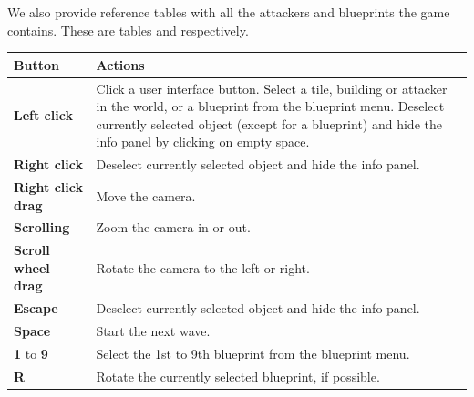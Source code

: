 We also provide reference tables with all the attackers and blueprints the game contains.
These are tables  and  respectively.

\begin{table}[H]
    \centering
    \begin{tabular}{m{}m{}}
        \toprule
        \textbf{Button}                                   & \textbf{Actions}                                                     \\
        \midrule
        \textbf{Left click}                               & Click a user interface button. \vspace{4pt}\newline
        Select a tile, building or attacker in the world, or a blueprint from the blueprint menu. \vspace{4pt}\newline
        Deselect currently selected object (except for a blueprint) and hide the info panel by clicking on empty space.          \\\midrule
        \textbf{Right click}                              & Deselect currently selected object and hide the info panel.          \\\midrule
        \textbf{Right click \newline drag}                & Move the camera.                                                     \\\midrule
        \textbf{Scrolling}                                & Zoom the camera in or out.                                           \\\midrule
        \textbf{Scroll wheel \newline drag}               & Rotate the camera to the left or right.                              \\\midrule
        \textbf{Escape}                                   & Deselect currently selected object and hide the info panel.          \\\midrule
        \textbf{Space}                                    & Start the next wave.                                                 \\\midrule
        \textbf{1} to \textbf{9}                          & Select the 1st to 9th blueprint from the blueprint menu.             \\\midrule
        \textbf{R}                                        & Rotate the currently selected blueprint, if possible.                \\\midrule

\end{tabular}
\end{table}
